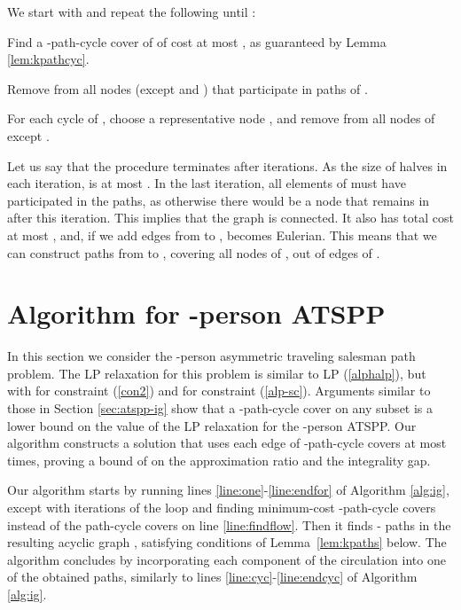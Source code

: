 \documentclass[11pt]{article}
\newcommand{\qed}{\hspace*{\fill}}
\newenvironment{proofof}[1]{\medskip \noindent {\bf{Proof of #1. }}}{\qed}
\begin{document}
\begin{proofof}{Theorem \ref{thm:kpath}}
We start with  and repeat the following until : 
\begin{compactenum}
\item
Find a -path-cycle cover  of  of cost at most , as guaranteed by Lemma \ref{lem:kpathcyc}.
\item
Remove from  all nodes (except  and ) that participate in paths of .
\item
For each cycle  of , choose a representative node , and remove from  all nodes of  except .
\end{compactenum}

\noindent
Let us say that the procedure terminates after  iterations. As the size of  halves in each iteration, 
 is at most . In the last iteration, all elements of  must have participated in the paths, 
as otherwise there would be a node  that remains in  after this iteration. This implies that the graph 
 is connected. It also has total cost at most , and, if we add  edges from  to 
, becomes Eulerian. This means that we can construct 
 paths from  to , covering all nodes of , out of edges of . 
\end{proofof}

\section{Algorithm for -person ATSPP}\label{sec:kperson}
In this section we consider the 
-person asymmetric traveling salesman path problem. 
The LP relaxation for this problem is similar to LP (\ref{alphalp}), but with 
 for constraint (\ref{con2}) and  for constraint (\ref{alp-sc}). 
Arguments similar to those in Section \ref{sec:atspp-ig} show that a -path-cycle cover on any subset  is a 
lower bound on the value of the LP relaxation for the -person ATSPP. Our algorithm constructs a solution that 
uses each edge of  -path-cycle covers at most  times, proving a bound of  on the  approximation ratio and the integrality gap.

Our algorithm starts by running lines \ref{line:one}-\ref{line:endfor} of Algorithm \ref{alg:ig}, except 
with  iterations of the loop and finding minimum-cost -path-cycle covers instead of 
the path-cycle covers on line \ref{line:findflow}. Then it finds  - paths in the resulting acyclic
 graph , satisfying conditions of Lemma~\ref{lem:kpaths} below. The algorithm concludes by incorporating each 
component of the circulation  into one of the obtained paths, similarly to lines \ref{line:cyc}-\ref{line:endcyc} 
of Algorithm \ref{alg:ig}. 
\end{document}
